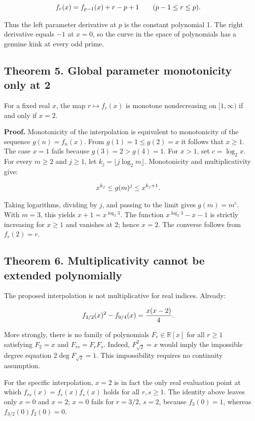\documentclass[11pt,a4paper]{article}
\newcommand{\fitmath}[1]{\begingroup\setbox0=\hbox{$\displaystyle #1$}\ifdim\wd0>\linewidth\resizebox{\linewidth}{!}{\box0}\else\box0\fi\endgroup}
\begin{document}
\[
\fitmath{f_r(x)=f_{p-1}(x)+r-p+1\qquad(p-1\leq r\leq p).}
\]


Thus the left parameter derivative at $p$ is the constant polynomial 1. The right derivative equals $-1$ at $x=0$, so the curve in the space of polynomials has a genuine kink at every odd prime.


\subsection*{Theorem 5. Global parameter monotonicity only at 2}

For a fixed real $x$, the map $r\mapsto f_r(x)$ is monotone nondecreasing on $[1,\infty)$ if and only if $x=2$.


\textbf{Proof.} Monotonicity of the interpolation is equivalent to monotonicity of the sequence $g(n)=f_n(x)$. From $g(1)=1\leq g(2)=x$ it follows that $x\geq1$. The case $x=1$ fails because $g(3)=2>g(4)=1$. For $x>1$, set $c=\log_2 x$. For every $m\geq2$ and $j\geq1$, let $k_j=\lfloor j\log_2 m\rfloor$. Monotonicity and multiplicativity give:


\[
\fitmath{x^{k_j}\leq g(m)^j\leq x^{k_j+1}.}
\]


Taking logarithms, dividing by $j$, and passing to the limit gives $g(m)=m^c$. With $m=3$, this yields $x+1=x^{\log_2 3}$. The function $x^{\log_2 3}-x-1$ is strictly increasing for $x\geq1$ and vanishes at 2; hence $x=2$. The converse follows from $f_r(2)=r$.


\subsection*{Theorem 6. Multiplicativity cannot be extended polynomially}

The proposed interpolation is not multiplicative for real indices. Already:


\[
\fitmath{f_{3/2}(x)^2-f_{9/4}(x)=\frac{x(x-2)}4.}
\]


More strongly, there is no family of polynomials $F_r\in\mathbb R[x]$ for all $r\geq1$ satisfying $F_2=x$ and $F_{rs}=F_rF_s$. Indeed, $F_{\sqrt2}^2=x$ would imply the impossible degree equation $2\deg F_{\sqrt2}=1$. This impossibility requires no continuity assumption.


For the specific interpolation, $x=2$ is in fact the only real evaluation point at which $f_{rs}(x)=f_r(x)f_s(x)$ holds for all $r,s\geq1$. The identity above leaves only $x=0$ and $x=2$; $x=0$ fails for $r=3/2$, $s=2$, because $f_3(0)=1$, whereas $f_{3/2}(0)f_2(0)=0$.
\end{document}
